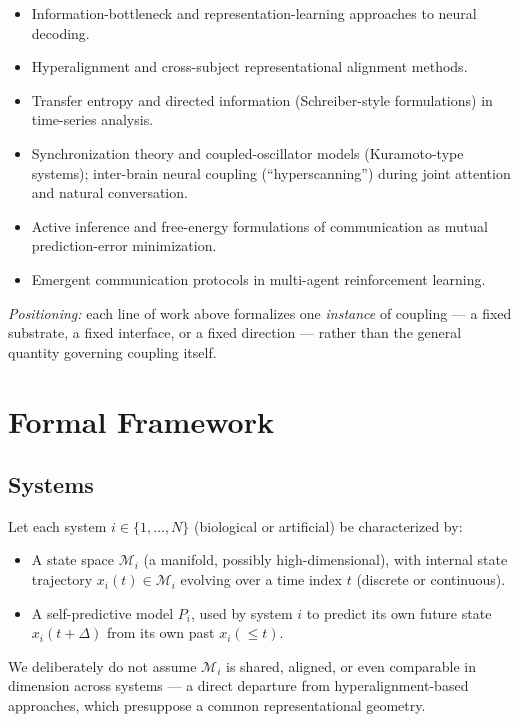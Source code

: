 \documentclass[11pt]{article}
\begin{document}
\begin{itemize}[leftmargin=1.2em]
    \item Information-bottleneck and representation-learning approaches to neural decoding.
    \item Hyperalignment and cross-subject representational alignment methods.
    \item Transfer entropy and directed information (Schreiber-style formulations) in time-series analysis.
    \item Synchronization theory and coupled-oscillator models (Kuramoto-type systems); inter-brain neural coupling (``hyperscanning'') during joint attention and natural conversation.
    \item Active inference and free-energy formulations of communication as mutual prediction-error minimization.
    \item Emergent communication protocols in multi-agent reinforcement learning.
\end{itemize}

\noindent \textit{Positioning:} each line of work above formalizes one \emph{instance} of coupling --- a fixed substrate, a fixed interface, or a fixed direction --- rather than the general quantity governing coupling itself.

\section{Formal Framework}

\subsection{Systems}

Let each system $i \in \{1, \dots, N\}$ (biological or artificial) be characterized by:

\begin{itemize}[leftmargin=1.2em]
    \item A state space $\mathcal{M}_i$ (a manifold, possibly high-dimensional), with internal state trajectory $x_i(t) \in \mathcal{M}_i$ evolving over a time index $t$ (discrete or continuous).
    \item A self-predictive model $P_i$, used by system $i$ to predict its own future state $x_i(t+\Delta)$ from its own past $x_i(\leq t)$.
\end{itemize}

We deliberately do not assume $\mathcal{M}_i$ is shared, aligned, or even comparable in dimension across systems --- a direct departure from hyperalignment-based approaches, which presuppose a common representational geometry.
\end{document}
